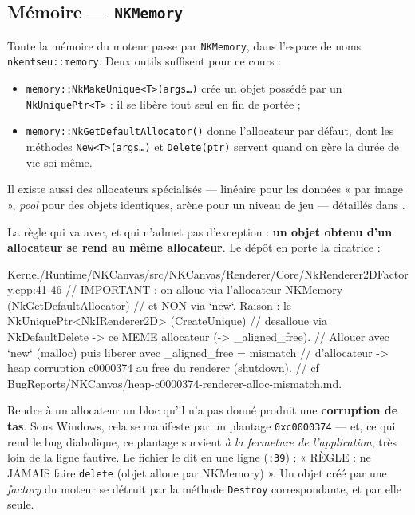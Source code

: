 \subsection{Mémoire — \texttt{NKMemory}}

Toute la mémoire du moteur passe par \texttt{NKMemory}, dans l'espace de noms
\texttt{nkentseu::memory}. Deux outils suffisent pour ce cours :

\begin{itemize}
  \item \texttt{memory::NkMakeUnique<T>(args\dots)} crée un objet possédé par un
        \texttt{NkUniquePtr<T>} : il se libère tout seul en fin de portée ;
  \item \texttt{memory::NkGetDefaultAllocator()} donne l'allocateur par défaut,
        dont les méthodes \texttt{New<T>(args\dots)} et \texttt{Delete(ptr)}
        servent quand on gère la durée de vie soi-même.
\end{itemize}

Il existe aussi des allocateurs spécialisés — linéaire pour les données « par
image », \emph{pool} pour des objets identiques, arène pour un niveau de jeu —
détaillés dans .

La règle qui va avec, et qui n'admet pas d'exception : \textbf{un objet obtenu
d'un allocateur se rend au même allocateur}. Le dépôt en porte la cicatrice :

\begin{nkcode}{Kernel/Runtime/NKCanvas/src/NKCanvas/Renderer/Core/NkRenderer2DFactory.cpp:41-46}
// IMPORTANT : on alloue via l'allocateur NKMemory (NkGetDefaultAllocator)
// et NON via `new`. Raison : le NkUniquePtr<NkIRenderer2D> (CreateUnique)
// desalloue via NkDefaultDelete -> ce MEME allocateur (-> _aligned_free).
// Allouer avec `new` (malloc) puis liberer avec _aligned_free = mismatch
// d'allocateur -> heap corruption c0000374 au free du renderer (shutdown).
// cf BugReports/NKCanvas/heap-c0000374-renderer-alloc-mismatch.md.
\end{nkcode}

\begin{nkpiege}
Rendre à un allocateur un bloc qu'il n'a pas donné produit une
\textbf{corruption de tas}. Sous Windows, cela se manifeste par un plantage
\texttt{0xc0000374} — et, ce qui rend le bug diabolique, ce plantage survient
\emph{à la fermeture de l'application}, très loin de la ligne fautive. Le
fichier 
le dit en une ligne (\texttt{:39}) : « RÈGLE : ne JAMAIS faire \texttt{delete}
(objet alloue par NKMemory) ». Un objet créé par une \emph{factory} du moteur se
détruit par la méthode \texttt{Destroy} correspondante, et par elle seule.
\end{nkpiege}

